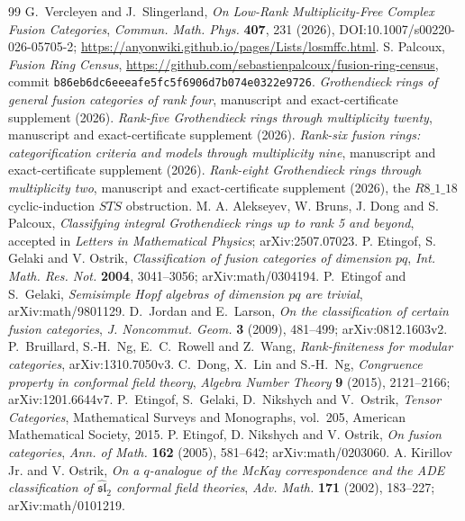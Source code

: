 \documentclass[11pt]{article}
\begin{document}
\begin{thebibliography}{99}
 G.~Vercleyen and J.~Slingerland,
\emph{On Low-Rank Multiplicity-Free Complex Fusion Categories},
\emph{Commun. Math. Phys.} \textbf{407}, 231 (2026),
DOI:10.1007/s00220-026-05705-2;
\url{https://anyonwiki.github.io/pages/Lists/losmffc.html}.
 S. Palcoux, \emph{Fusion Ring Census},
\url{https://github.com/sebastienpalcoux/fusion-ring-census},
commit \texttt{b86eb6dc6eeeafe5fc5f6906d7b074e0322e9726}.
 \emph{Grothendieck rings of general fusion categories of rank four}, manuscript and exact-certificate supplement (2026).
 \emph{Rank-five Grothendieck rings through multiplicity twenty}, manuscript and exact-certificate supplement (2026).
 \emph{Rank-six fusion rings: categorification criteria and models through multiplicity nine}, manuscript and exact-certificate supplement (2026).
 \emph{Rank-eight Grothendieck rings through multiplicity two}, manuscript and exact-certificate supplement (2026), the $R8\_1\_18$ cyclic-induction $STS$ obstruction.
 M. A. Alekseyev, W. Bruns, J. Dong and S. Palcoux,
\emph{Classifying integral Grothendieck rings up to rank 5 and beyond},
accepted in \emph{Letters in Mathematical Physics}; arXiv:2507.07023.
 P. Etingof, S. Gelaki and V. Ostrik,
\emph{Classification of fusion categories of dimension $pq$},
\emph{Int. Math. Res. Not.} \textbf{2004}, 3041--3056; arXiv:math/0304194.
 P.~Etingof and S.~Gelaki,
\emph{Semisimple Hopf algebras of dimension $pq$ are trivial},
arXiv:math/9801129.
 D.~Jordan and E.~Larson,
\emph{On the classification of certain fusion categories},
\emph{J. Noncommut. Geom.} \textbf{3} (2009), 481--499; arXiv:0812.1603v2.
 P.~Bruillard, S.-H.~Ng, E.~C.~Rowell and Z.~Wang,
\emph{Rank-finiteness for modular categories}, arXiv:1310.7050v3.
 C.~Dong, X.~Lin and S.-H.~Ng,
\emph{Congruence property in conformal field theory},
\emph{Algebra Number Theory} \textbf{9} (2015), 2121--2166;
arXiv:1201.6644v7.
 P.~Etingof, S.~Gelaki, D.~Nikshych and V.~Ostrik,
\emph{Tensor Categories}, Mathematical Surveys and Monographs,
vol.~205, American Mathematical Society, 2015.
 P. Etingof, D. Nikshych and V. Ostrik,
\emph{On fusion categories}, \emph{Ann. of Math.} \textbf{162} (2005), 581--642; arXiv:math/0203060.
 A. Kirillov Jr. and V. Ostrik,
\emph{On a $q$-analogue of the McKay correspondence and the ADE classification of $\widehat{\mathfrak{sl}}_2$ conformal field theories},
\emph{Adv. Math.} \textbf{171} (2002), 183--227; arXiv:math/0101219.

\end{thebibliography}
\end{document}
